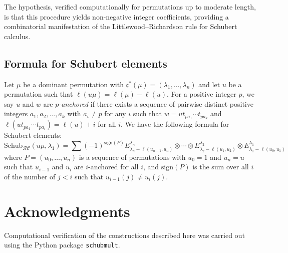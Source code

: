 \documentclass{amsart}
\theoremstyle{definition}
\theoremstyle{remark}
\numberwithin{equation}{section}
\newcommand{\RC}{\mathcal{RC}}
\newcommand{\code}{\mathfrak{c}}
\begin{document}
The hypothesis, verified computationally for permutations up to moderate length, is that this procedure yields non-negative integer coefficients, providing a combinatorial manifestation of the Littlewood--Richardson rule for Schubert calculus.

\subsection{Formula for Schubert elements}

Let $\mu$ be a dominant permutation with $\code^*(\mu) = (\lambda_1,\ldots,\lambda_n)$ and let $u$ be a permutation such that $\ell(u\mu) = \ell(\mu) - \ell(u)$. For a positive integer $p$, we say $u$ and $w$ are \emph{$p$-anchored} if there exists a sequence of pairwise distinct positive integers $a_1,a_2,\ldots,a_k$ with $a_i\neq p$ for any $i$ such that $w=ut_{pa_1}\cdots t_{pa_k}$ and $\ell(ut_{pa_1}\cdots t_{pa_i})=\ell(u)+i$ for all $i$. We have the following formula for Schubert elements:
$$\mathrm{Schub}_{\RC}(u\mu, \lambda_1) = \sum (-1)^{\mathrm{sign}(P)}E_{\lambda_n-\ell(u_{n-1},u_n)}^{\lambda_n}\otimes \cdots \otimes E_{\lambda_2-\ell(u_1,u_2)}^{\lambda_2}\otimes E_{\lambda_1-\ell(u_0,u_1)}^{\lambda_1}$$
where $P=(u_0,\ldots,u_n)$ is a sequence of permutations with $u_0=1$ and $u_n=u$ such that $u_{i-1}$ and $u_i$ are $i$-anchored for all $i$, and $\mathrm{sign}(P)$ is the sum over all $i$ of the number of $j<i$ such that $u_{i-1}(j)\neq u_i(j)$.

\section*{Acknowledgments}

Computational verification of the constructions described here was carried out using the Python package \texttt{schubmult}.

\cite{samuelmolev}


\end{document}
